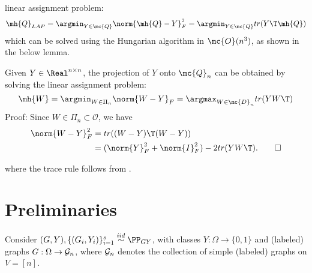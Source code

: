 linear assignment problem:
\begin{align}
	\mh{Q}_{LAP} = \argmin_{Y \in \mc{Q}} \norm{\mh{Q} - Y}_F^2 = \argmin_{Y \in \mc{Q}} tr (Y\T \mh{Q})
\end{align}
which can be solved using the Hungarian algorithm in $\mc{O}(n^3)$, as shown in the below lemma. 

\begin{Lem}
  Given $Y \in \Real^{n \times n}$, the projection of $Y$ onto $\mc{Q}_n$ can
  be obtained by solving the linear assignment problem:
  $$ 
  \mh{W}= \argmin_{W \in \Pi_n} \norm{ W-Y}_F = \argmax_{W \in \mc{D}_n}  tr(YW\T)
  $$
  Proof: Since $W \in \Pi_n \subset \mathcal O$, we have
  \begin{align}
  \norm{W-Y}_F^2 &= tr( (W-Y)\T (W-Y)) \\
  &= (\norm{Y}_F^2 + \norm{I}_F^2) - 2tr( Y W\T ). \qed
  \end{align}
\end{Lem}
where the trace rule follows from \cite{HornJohnson}.







\section{Preliminaries} %
\label{sec:preliminaries}



Consider $(G,Y),\{(G_i,Y_i)\}_{i=1}^s \overset{iid}{\sim} \PP_{GY}$,
with classes $Y:\Omega \rightarrow \{0,1\}$ and
(labeled) graphs $G:\Omega \rightarrow \mathcal{G}_n$,
where $\mathcal{G}_n$ denotes the collection of simple (labeled) graphs on $V=[n]$.

